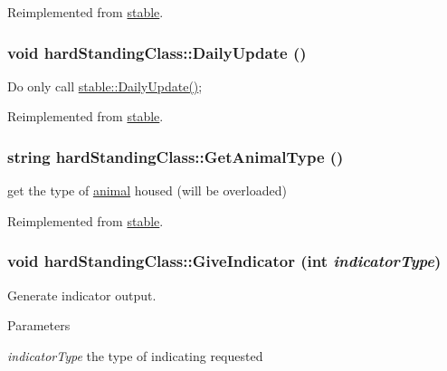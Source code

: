 Reimplemented from \hyperlink{classstable_a2014aabbb54c1309c936c527f3d385e8}{stable}.\hypertarget{classhard_standing_class_ac182354be245579d4b8ec936add0c0be}{
\subsubsection[{DailyUpdate}]{\setlength{\rightskip}{0pt plus 5cm}void hardStandingClass::DailyUpdate ()}}
\label{classhard_standing_class_ac182354be245579d4b8ec936add0c0be}
Do only call \hyperlink{classstable_a8bdbc59976ddb6c324e7b629794ff388}{stable::DailyUpdate()}; 

Reimplemented from \hyperlink{classstable_a8bdbc59976ddb6c324e7b629794ff388}{stable}.\hypertarget{classhard_standing_class_a3fb5297a67e0d2af40b940c22e2d2408}{
\subsubsection[{GetAnimalType}]{\setlength{\rightskip}{0pt plus 5cm}string hardStandingClass::GetAnimalType ()}}
\label{classhard_standing_class_a3fb5297a67e0d2af40b940c22e2d2408}


get the type of \hyperlink{classanimal}{animal} housed (will be overloaded) 

Reimplemented from \hyperlink{classstable_af11653ccffcdc3bfb928d47485fc39b4}{stable}.\hypertarget{classhard_standing_class_a2a5c5d0905de0042918e0829e24145a3}{
\subsubsection[{GiveIndicator}]{\setlength{\rightskip}{0pt plus 5cm}void hardStandingClass::GiveIndicator (int {\em indicatorType})}}
\label{classhard_standing_class_a2a5c5d0905de0042918e0829e24145a3}


Generate indicator output. 
\begin{DoxyParams}{Parameters}
\item[{\em indicatorType}]the type of indicating requested \end{DoxyParams}


